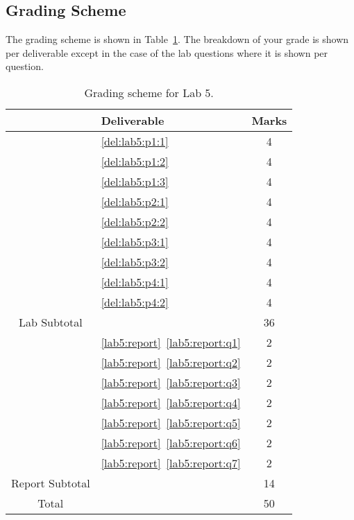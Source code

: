 \subsection{Grading Scheme}
The grading scheme is shown in Table~\ref{tab:lab5:grading}. The breakdown of
your grade is shown per deliverable except in the case of the lab
questions where it is shown per question.
%
\begin{table}
\centering
\begin{tabular}{c|l|c}
        & Deliverable           & Marks  \\ \hline
        & \ref{del:lab5:p1:1}         & 4       \\ \hline
        & \ref{del:lab5:p1:2}         & 4       \\ \hline
        & \ref{del:lab5:p1:3}         & 4      \\ \hline
        & \ref{del:lab5:p2:1}         & 4      \\ \hline
        & \ref{del:lab5:p2:2}         & 4       \\ \hline
        & \ref{del:lab5:p3:1}         & 4       \\ \hline
        & \ref{del:lab5:p3:2}         & 4       \\ \hline
        & \ref{del:lab5:p4:1}         & 4       \\ \hline
        & \ref{del:lab5:p4:2}         & 4       \\ \hhline{=|=|=}
Lab Subtotal&                       & 36      \\ \hhline{=|=|=}
        & \ref{lab5:report}~\ref{lab5:report:q1}  & 2       \\ \hline
        & \ref{lab5:report}~\ref{lab5:report:q2}  & 2       \\ \hline
        & \ref{lab5:report}~\ref{lab5:report:q3}  & 2       \\ \hline
        & \ref{lab5:report}~\ref{lab5:report:q4}  & 2      \\ \hline
        & \ref{lab5:report}~\ref{lab5:report:q5}  & 2      \\ \hline
        & \ref{lab5:report}~\ref{lab5:report:q6}  & 2      \\ \hline
        & \ref{lab5:report}~\ref{lab5:report:q7}  & 2      \\ \hhline{=|=|=}
Report Subtotal&  & 14 \\ \hhline{=|=|=}
  Total &                       & 50
\end{tabular}
\caption[Grading Scheme for Lab 5]{Grading scheme for Lab 5.}
\label{tab:lab5:grading}
\end{table}
%
